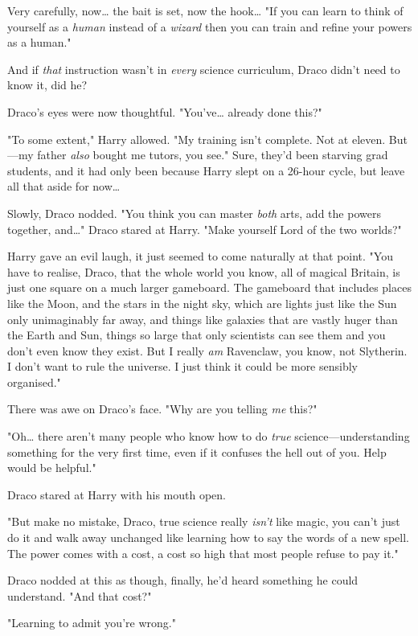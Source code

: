 Very carefully, now{\ldots} the bait is set, now the hook{\ldots} "If you can
learn to think of yourself as a \emph{human} instead of a \emph{wizard} then
you can train and refine your powers as a human."

And if \emph{that} instruction wasn't in \emph{every} science curriculum, Draco
didn't need to know it, did he?

Draco's eyes were now thoughtful. "You've{\ldots} already done this?"

"To some extent," Harry allowed. "My training isn't complete. Not at eleven.
But---my father \emph{also} bought me tutors, you see." Sure, they'd been
starving grad students, and it had only been because Harry slept on a 26-hour
cycle, but leave all that aside for now{\ldots}

Slowly, Draco nodded. "You think you can master \emph{both} arts, add the
powers together, and{\ldots}" Draco stared at Harry. "Make yourself Lord of the
two worlds?"

Harry gave an evil laugh, it just seemed to come naturally at that point. "You
have to realise, Draco, that the whole world you know, all of magical Britain,
is just one square on a much larger gameboard. The gameboard that includes
places like the Moon, and the stars in the night sky, which are lights just
like the Sun only unimaginably far away, and things like galaxies that are
vastly huger than the Earth and Sun, things so large that only scientists can
see them and you don't even know they exist. But I really \emph{am} Ravenclaw,
you know, not Slytherin. I don't want to rule the universe. I just think it
could be more sensibly organised."

There was awe on Draco's face. "Why are you telling \emph{me} this?"

"Oh{\ldots} there aren't many people who know how to do \emph{true}
science---understanding something for the very first time, even if it confuses
the hell out of you. Help would be helpful."

Draco stared at Harry with his mouth open.

"But make no mistake, Draco, true science really \emph{isn't} like magic, you
can't just do it and walk away unchanged like learning how to say the words of
a new spell. The power comes with a cost, a cost so high that most people
refuse to pay it."

Draco nodded at this as though, finally, he'd heard something he could
understand. "And that cost?"

"Learning to admit you're wrong."

